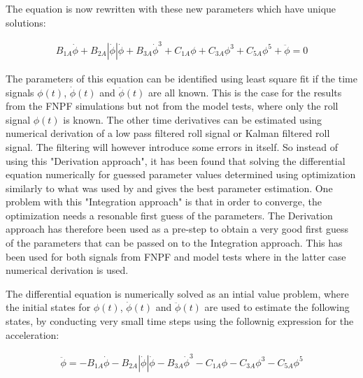     

    The equation is now rewritten with these new parameters which have
unique solutions:
 
            
    
    \begin{equation}
\begin{aligned}
B_{1A} \dot{\phi} + B_{2A} \left|{\dot{\phi}}\right| \dot{\phi} + B_{3A} \dot{\phi}^{3} + C_{1A} \phi + C_{3A} \phi^{3} + C_{5A} \phi^{5} + \ddot{\phi} = 0
\end{aligned}
\label{eq:equation}
\end{equation}

    

    The parameters of this equation can be identified using least square fit
if the time signals \(\phi(t)\), \(\dot{\phi}(t)\) and
\(\ddot{\phi}(t)\) are all known. This is the case for the results from
the FNPF simulations but not from the model tests, where only the roll
signal \(\phi(t)\) is known. The other time derivatives can be estimated
using numerical derivation of a low pass filtered roll signal or Kalman
filtered roll signal. The filtering will however introduce some errors
in itself. So instead of using this "Derivation approach", it has been
found that solving the differential equation numerically for guessed
parameter values determined using optimization similarly to what was
used by \cite{7505983/FJHQJJUH} and \cite{7505983/9B7QMVJJ} gives the
best parameter estimation. One problem with this "Integration approach"
is that in order to converge, the optimization needs a resonable first
guess of the parameters. The Derivation approach has therefore been used
as a pre-step to obtain a very good first guess of the parameters that
can be passed on to the Integration approach. This has been used for
both signals from FNPF and model tests where in the latter case
numerical derivation is used.

The differential equation is numerically solved as an intial value
problem, where the initial states for \(\phi(t)\), \(\dot{\phi}(t)\) and
\(\ddot{\phi}(t)\) are used to estimate the following states, by
conducting very small time steps using the follownig expression for the
acceleration:
 
            
    
    \begin{equation}
\begin{aligned}
\ddot{\phi} = - B_{1A} \dot{\phi} - B_{2A} \left|{\dot{\phi}}\right| \dot{\phi} - B_{3A} \dot{\phi}^{3} - C_{1A} \phi - C_{3A} \phi^{3} - C_{5A} \phi^{5}
\end{aligned}
\label{eq:equation}
\end{equation}

